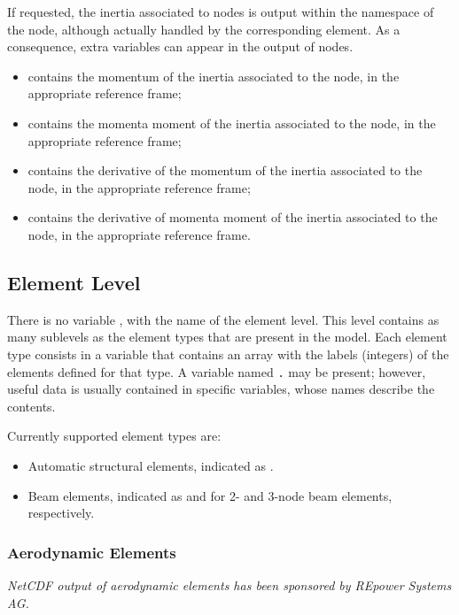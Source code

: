 If requested, the inertia associated to  nodes is output
within the namespace of the node, although actually handled
by the corresponding  element.
As a consequence, extra variables can appear in the output
of  nodes.
\begin{itemize}
\item {} contains the momentum of the inertia
associated to the node, in the appropriate reference frame;

\item {} contains the momenta moment of the inertia
associated to the node, in the appropriate reference frame;

\item {} contains the derivative of the momentum
of the inertia associated to the node, in the appropriate reference frame;

\item {} contains the derivative of momenta moment
of the inertia associated to the node, in the appropriate reference frame.
\end{itemize}


\subsection{Element Level}
There is no variable , with the name of the element level.
This level contains as many sublevels as the element types
that are present in the model.
Each element type consists in a variable that contains an array
with the labels (integers) of the elements defined for that type.
A variable named \texttt{.} may be present; however,
useful data is usually contained in specific variables,
whose names describe the contents.

Currently supported element types are:
\begin{itemize}
\item Automatic structural elements, indicated as .
\item Beam elements, indicated as  and 
for 2- and 3-node beam elements, respectively.
\end{itemize}


\subsubsection{Aerodynamic Elements}
\label{sec:NetCDF:Elem:Aerodynamic}
\emph{NetCDF output of aerodynamic elements has been sponsored
by REpower Systems AG.}

